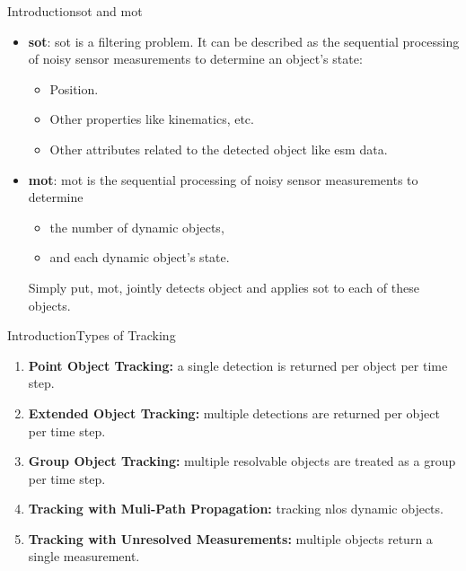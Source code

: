 \documentclass{beamer}
\begin{document}
\begin{frame}{Introduction}{\acrfull{sot} and \acrfull{mot}}
	\begin{itemize}
		\item \textbf{\acrfull{sot}}: \acrshort{sot} is a
		filtering problem. It can be described as the sequential processing of noisy sensor measurements to determine an object’s state:
		\begin{itemize}
			\item Position.
			\item Other properties like kinematics, etc.
			\item Other attributes related to the detected object like \gls{esm} data.
		\end{itemize}
		\item \textbf{\acrfull{mot}}: \gls{mot} is the sequential processing of noisy sensor measurements to determine
		\begin{itemize}
			\item the number of dynamic objects,
			\item and each dynamic object’s state.
		\end{itemize}
		Simply put, \gls{mot}, jointly detects object and applies \gls{sot} to each of these objects.
	\end{itemize}
\end{frame}
\begin{frame}{Introduction}{Types of Tracking}
	\begin{enumerate}
		\item \textbf{Point Object Tracking:} a single detection is returned per object per time step.
		\item \textbf{Extended Object Tracking:} multiple detections are returned per object per time step.
		\item \textbf{Group Object Tracking:} multiple resolvable objects are treated as a group per time step.
		\item \textbf{Tracking with Muli-Path Propagation: } tracking \gls{nlos} dynamic objects.
		\item \textbf{Tracking with Unresolved Measurements:} multiple objects return a single measurement.
	\end{enumerate}
\end{frame}
\end{document}
